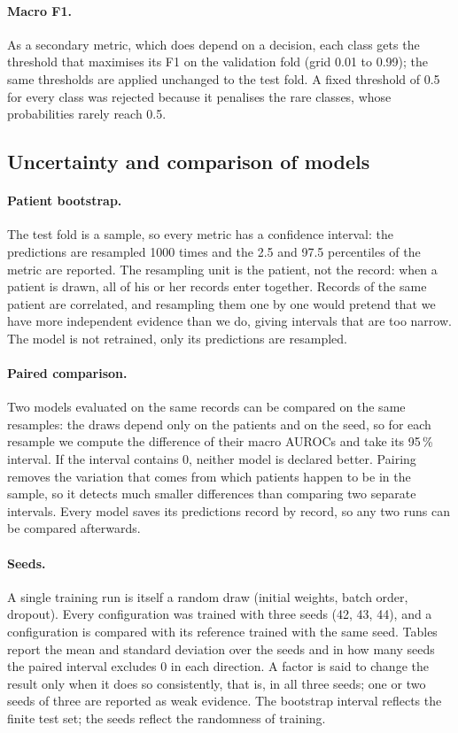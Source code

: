 \paragraph{Macro F1.} As a secondary metric, which does depend on a decision, each class gets the
threshold that maximises its F1 on the validation fold (grid 0.01 to 0.99); the same thresholds are
applied unchanged to the test fold. A fixed threshold of 0.5 for every class was rejected because it
penalises the rare classes, whose probabilities rarely reach 0.5.

\subsection{Uncertainty and comparison of models}

\paragraph{Patient bootstrap.} The test fold is a sample, so every metric has a confidence interval: the
predictions are resampled 1000 times and the 2.5 and 97.5 percentiles of the metric are reported. The
resampling unit is the patient, not the record: when a patient is drawn, all of his or her records enter
together. Records of the same patient are correlated, and resampling them one by one would pretend that
we have more independent evidence than we do, giving intervals that are too narrow. The model is not
retrained, only its predictions are resampled.

\paragraph{Paired comparison.} Two models evaluated on the same records can be compared on the same
resamples: the draws depend only on the patients and on the seed, so for each resample we compute the
difference of their macro AUROCs and take its 95\,\% interval. If the interval contains 0, neither model
is declared better. Pairing removes the variation that comes from which patients happen to be in the
sample, so it detects much smaller differences than comparing two separate intervals. Every model saves
its predictions record by record, so any two runs can be compared afterwards.

\paragraph{Seeds.} A single training run is itself a random draw (initial weights, batch order,
dropout). Every configuration was trained with three seeds (42, 43, 44), and a configuration is compared
with its reference trained with the same seed. Tables report the mean and standard deviation over the
seeds and in how many seeds the paired interval excludes 0 in each direction. A factor is said to change
the result only when it does so consistently, that is, in all three seeds; one or two seeds of three
are reported as weak evidence. The bootstrap interval reflects the finite test set; the seeds reflect the
randomness of training.

